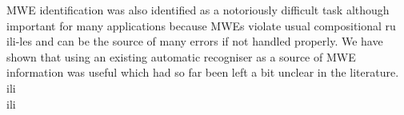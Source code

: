 \documentclass[output=paper]{LSP/langsci}
\begin{document}
{{\ili{}\indent\ili{} MWE\ili{} identification\ili{} was\ili{} also\ili{} identified\ili{} as\ili{} a\ili{} notoriously\ili{} difficult\ili{} task\ili{} although\ili{} important\ili{} for\ili{} many\ili{} applications\ili{} because\ili{} MWEs\ili{} violate\ili{} usual\ili{} compositional\ili{} ru\ili{}\\ili{}-les\ili{} and\ili{} can\ili{} be\ili{} the\ili{} source\ili{} of\ili{} many\ili{} errors\ili{} if\ili{} not\ili{} handled\ili{} properly\ili{}.\ili{} We\ili{} have\ili{} shown\ili{} that\ili{} using\ili{} an\ili{} existing\ili{} automatic\ili{} recogniser\ili{} as\ili{} a\ili{} source\ili{} of\ili{} MWE\ili{} information\ili{} was\ili{} useful\ili{} which\ili{} had\ili{} so\ili{} far\ili{} been\ili{} left\ili{} a\ili{} bit\ili{} unclear\ili{} in\ili{} the\ili{} literature\ili{}.\ili{} \ili{}\\ili{}\\ili{}
}}
\end{document}
